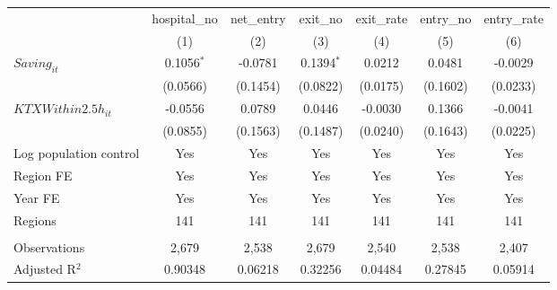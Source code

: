 \begingroup
\centering
\begin{tabular}{lcccccc}
   \toprule
                          & hospital\_no  & net\_entry  & exit\_no     & exit\_rate  & entry\_no  & entry\_rate \\    
                          & (1)           & (2)         & (3)          & (4)         & (5)        & (6)\\  
   \midrule 
   $Saving_{it}$          & 0.1056$^{*}$  & -0.0781     & 0.1394$^{*}$ & 0.0212      & 0.0481     & -0.0029\\   
                          & (0.0566)      & (0.1454)    & (0.0822)     & (0.0175)    & (0.1602)   & (0.0233)\\   
   $KTXWithin2.5h_{it}$   & -0.0556       & 0.0789      & 0.0446       & -0.0030     & 0.1366     & -0.0041\\   
                          & (0.0855)      & (0.1563)    & (0.1487)     & (0.0240)    & (0.1643)   & (0.0225)\\   
   Log population control & Yes           & Yes         & Yes          & Yes         & Yes        & Yes\\  
   Region FE              & Yes           & Yes         & Yes          & Yes         & Yes        & Yes\\  
   Year FE                & Yes           & Yes         & Yes          & Yes         & Yes        & Yes\\  
   Regions                & 141           & 141         & 141          & 141         & 141        & 141\\  
    \\
   Observations           & 2,679         & 2,538       & 2,679        & 2,540       & 2,538      & 2,407\\  
   Adjusted R$^2$         & 0.90348       & 0.06218     & 0.32256      & 0.04484     & 0.27845    & 0.05914\\  
   \bottomrule
\end{tabular}
\par\endgroup
